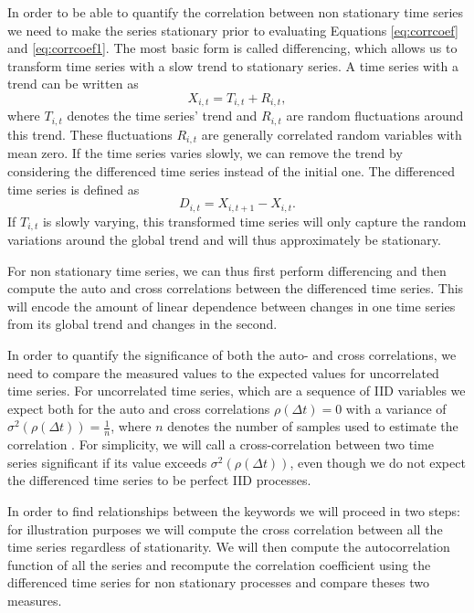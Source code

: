 \documentclass[12pt, a4paper]{article}
\begin{document}
In order to be able to quantify the correlation between non stationary time series we need to make the series stationary prior to evaluating Equations \ref{eq:corrcoef} and \ref{eq:corrcoef1}. The most basic form is called differencing, which allows us to transform time series with a slow trend to stationary series. A time series with a trend can be written as \cite{dettling14}
\begin{equation}
X_{i, t} = T_{i, t} + R_{i, t},
\end{equation} 
where $T_{i, t}$ denotes the time series' trend and $R_{i, t}$ are random fluctuations around this trend. These fluctuations $R_{i, t}$ are generally correlated random variables with mean zero. If the time series varies slowly, we can remove the trend by considering the differenced time series instead of the initial one. The differenced time series is defined as \cite{dettling14}
\begin{equation}
D_{i, t} = X_{i, t+1}- X_{i, t}.
\end{equation} 
If $T_{i, t}$ is slowly varying, this transformed time series will only capture the random variations around the global trend and will thus approximately be stationary.

For non stationary time series, we can thus first perform differencing and then compute the auto and cross correlations between the differenced time series. This will encode the amount of linear dependence between changes in one time series from its global trend and changes in the second. 

In order to quantify the significance of both the auto- and cross correlations, we need to compare the measured values to the expected values for uncorrelated time series. For uncorrelated time series, which are a sequence of IID variables we expect both for the auto and cross correlations $\rho(\Delta t) = 0$ with a variance of $\sigma^{2}(\rho(\Delta t)) = \frac{1}{n}$, where $n$ denotes the number of samples used to estimate the correlation \cite{dettling14}. For simplicity, we will call a cross-correlation between two time series significant if its value exceeds $\sigma^{2}(\rho(\Delta t))$, even though we do not expect the differenced time series to be perfect IID processes. 

In order to find relationships between the keywords we will proceed in two steps: for illustration purposes we will compute the cross correlation between all the time series regardless of stationarity. We will then compute the autocorrelation function of all the series and recompute the correlation coefficient using the differenced time series for non stationary processes and compare theses two measures.
\end{document}
